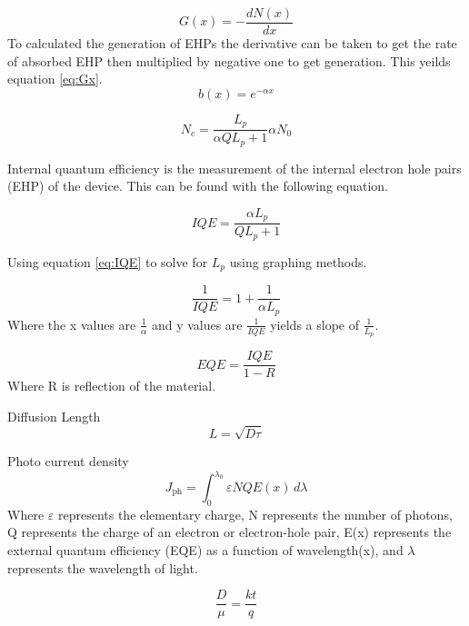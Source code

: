 \documentclass[10pt,a4paper]{article}
\begin{document}
\begin{multicols}{2}
\begin{equation}\label{eq:Gx}
G(x) =   - \frac{d N(x)}{ d x}
\end{equation}
To calculated the generation of EHPs the derivative can be taken to get the rate of absorbed EHP then multiplied by negative one to get generation. This yeilds equation \ref{eq:Gx}.
\begin{equation}\label{eq:Bx}
b(x) =  e^{-\alpha x}
\end{equation}

\begin{equation}\label{eq:NC}
N_c = \frac{L_p}{\alpha QL_p +1} \alpha N_0
\end{equation}

Internal quantum efficiency is the measurement of the internal electron hole pairs (EHP) of the device. This can be found with the following equation.

\begin{equation}\label{eq:IQE}
IQE = \frac{\alpha L_p}{QL_p +1}
\end{equation}

Using equation \ref{eq:IQE} to solve for $L_p$ using graphing methods.

\begin{equation}\label{eq:IQE}
\frac{1}{IQE} = 1+ \frac{1}{\alpha L_p}
\end{equation}
Where the x values are $\frac{1}{\alpha}$ and y values are $\frac{1}{IQE}$ yields a slope of $\frac{1}{L_p}$.

\begin{equation}\label{eq:EQE}
EQE = \frac{IQE}{1-R}
\end{equation}
Where R is reflection of the material.  

Diffusion Length
\begin{equation}\label{eq:difLen}
L = \sqrt{D\tau}
\end{equation}


Photo current density
\begin{equation}\label{eq:difLen}
J_{\text{ph}} = \int_{0}^{\lambda_0} \varepsilon N Q E(x) \,d\lambda
\end{equation}
Where $\varepsilon$ represents the elementary charge, N represents the number of photons, Q represents the charge of an electron or electron-hole pair, E(x) represents the external quantum efficiency (EQE) as a function of wavelength(x), and $\lambda$ represents the wavelength of light.


\begin{equation}\label{eq:difLen}
\frac{D}{\mu} = \frac{kt}{q}
\end{equation}





\end{multicols}
\end{document}
